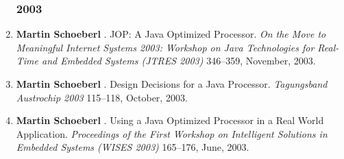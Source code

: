 \begin{enumerate}
\subsubsection*{2003}

\item {\bf Martin Schoeberl }.
 JOP: A Java Optimized Processor.
 \emph{On the Move to Meaningful Internet Systems 2003: Workshop on {J}ava Technologies for Real-Time and Embedded Systems (JTRES 2003)} 346--359, November, 2003.

\item {\bf Martin Schoeberl }.
 Design Decisions for a Java Processor.
 \emph{Tagungsband Austrochip 2003} 115--118, October, 2003.

\item {\bf Martin Schoeberl }.
 Using a Java Optimized Processor in a Real World Application.
 \emph{Proceedings of the First Workshop on Intelligent Solutions in Embedded Systems (WISES 2003)} 165--176, June, 2003.


\end{enumerate}

